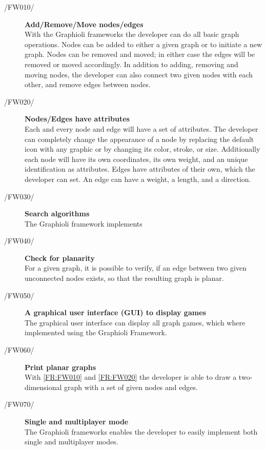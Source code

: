 \vspace{.5cm}

\begin{description}
  	\item[/FW010/\label{FR:FW010}] {\bf Add/Remove/Move nodes/edges}  \hfill \\
	With the Graphioli frameworks the developer can do all basic graph operations. Nodes can be added to either a given graph or to initiate a new graph. Nodes can be removed and moved; in either case the edges will be removed or moved accordingly. In addition to adding, removing and moving nodes, the developer can also connect two given nodes with each other, and remove edges between nodes.
	\item[/FW020/\label{FR:FW020}] {\bf Nodes/Edges have attributes}  \\
	Each and every node and edge will have a set of attributes. The developer can completely change the appearance of a node by replacing the default icon with any graphic or by changing its color, stroke, or size. Additionally each node will have its own coordinates, its own weight, and an unique identification as attributes. Edges have attributes of their own, which the developer can set. An edge can have a weight, a length, and a direction.
	\item[/FW030/\label{FR:FW030}] {\bf Search algorithms}  \\
	The Graphioli framework implements 
	\item[/FW040/\label{FR:FW040}] {\bf  Check for planarity}  \\
	For a given graph, it is possible to verify, if an edge between two given unconnected nodes exists, so that the resulting graph is planar.
 	\item[/FW050/\label{FR:FW050}] {\bf A graphical user interface (GUI) to display games}  \\
 	The graphical user interface  can display all graph games, which where implemented using the Graphioli Framework.
	\item[/FW060/\label{FR:FW060}] {\bf Print planar graphs}  \\
  	With \ref{FR:FW010} and \ref{FR:FW020} the developer is able to draw a two-dimensional graph with a set of given nodes and edges.
	\item[/FW070/\label{FR:FW070}] {\bf Single and multiplayer mode}  \\
	The Graphioli frameworks enables the developer to easily implement both single and multiplayer modes.
	

\end{description}
